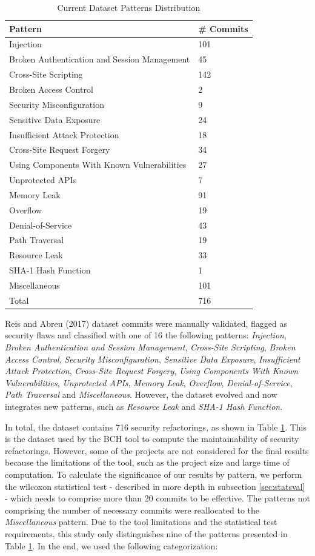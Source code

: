 \documentclass[10pt,conference]{IEEEtran}
\begin{document}
\begin{table}[h]
	\centering
\caption{Current Dataset Patterns Distribution} \label{tab:patterns}
\begin{tabular}{@{}ll@{}}
\toprule
Pattern & \# Commits\\
\midrule
Injection & 101\\
Broken Authentication and Session Management& 45\\
Cross-Site Scripting& 142\\
Broken Access Control& 2\\
Security Misconfiguration& 9\\
Sensitive Data Exposure& 24\\
Insufficient Attack Protection& 18\\
Cross-Site Request Forgery& 34\\
Using Components With Known Vulnerabilities& 27\\
Unprotected APIs& 7\\
Memory Leak& 91\\
Overflow& 19\\
Denial-of-Service& 43\\
Path Traversal& 19\\
Resource Leak& 33\\
SHA-1 Hash Function & 1\\
Miscellaneous& 101\\\midrule
Total& 716\\
\bottomrule
\end{tabular}
\end{table}

Reis and Abreu (2017) dataset commits were manually validated, flagged as security flaws and classified with one of 16 the following patterns: \textit{Injection}, \textit{Broken Authentication and Session Management}, \textit{Cross-Site Scripting}, \textit{Broken Access Control}, \textit{Security Misconfiguration}, \textit{Sensitive Data Exposure}, \textit{Insufficient Attack Protection}, \textit{Cross-Site Request Forgery}, \textit{Using Components With Known Vulnerabilities}, \textit{Unprotected APIs}, \textit{Memory Leak}, \textit{Overflow}, \textit{Denial-of-Service}, \textit{Path Traversal} and \textit{Miscellaneous}. However, the dataset evolved and now integrates new patterns, such as \textit{Resource Leak} and \textit{SHA-1 Hash Function}. 

In total, the dataset contains 716 security refactorings, as shown in Table \ref{tab:patterns}. This is the dataset used
by the BCH tool to compute the maintainability of security refactorings. However, some of the projects are not considered for
the final results because the limitations of the tool, such as the project size and large time of computation. To calculate the significance of our results by pattern, we perform the wilcoxon statistical test - described in more depth in subsection \ref{sec:statsval} - which needs to comprise more than 20 commits to be effective. The patterns not comprising the number of necessary commits were reallocated to the \textit{Miscellaneous} pattern. Due to the tool limitations and the statistical test requirements, this study only distinguishes nine of the patterns presented in Table \ref{tab:patterns}. In the
end, we used the following categorization:
\end{document}
